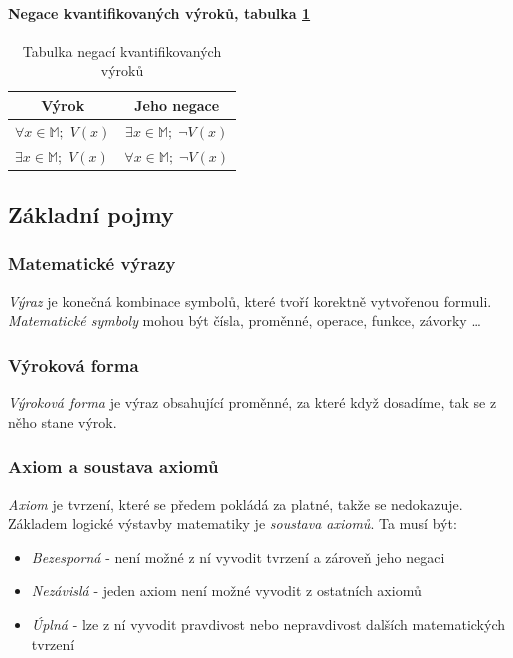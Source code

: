 \documentclass[12pt]{article}
\begin{document}
\paragraph{Negace kvantifikovaných výroků, tabulka \ref{table:logika-kvantifikatory}}
\begin{table}[h!]
\centering
\begin{tabular}{|c|c|}
\hline
Výrok                                                     & Jeho negace                                                   \\ \hline
$\forall x \in \mathbb{M}; \; V(x)$                       & $\exists x \in \mathbb{M}; \; \neg V(x)$                      \\ \hline
\multicolumn{1}{|l|}{$\exists x \in \mathbb{M}; \; V(x)$} & \multicolumn{1}{l|}{$\forall x \in \mathbb{M}; \; \neg V(x)$} \\ \hline
\end{tabular}
\caption{Tabulka negací kvantifikovaných výroků}
\label{table:logika-kvantifikatory}
\end{table}
\subsection{Základní pojmy}
\subsubsection{Matematické výrazy}
\emph{Výraz} je konečná kombinace symbolů, které tvoří korektně vytvořenou formuli. \emph{Matematické symboly} mohou být čísla, proměnné, operace, funkce, závorky \dots
\subsubsection{Výroková forma}
\emph{Výroková forma} je výraz obsahující proměnné, za které když dosadíme, tak se z něho stane výrok.
\subsubsection{Axiom a soustava axiomů}
\emph{Axiom} je tvrzení, které se předem pokládá za platné, takže se nedokazuje. Základem logické výstavby matematiky je \emph{soustava axiomů}. Ta musí být:
\begin{itemize}
\item \emph{Bezesporná} - není možné z ní vyvodit tvrzení a zároveň jeho negaci
\item \emph{Nezávislá} - jeden axiom není možné vyvodit z ostatních axiomů
\item \emph{Úplná} - lze z ní vyvodit pravdivost nebo nepravdivost dalších matematických tvrzení
\end{itemize}
\end{document}
